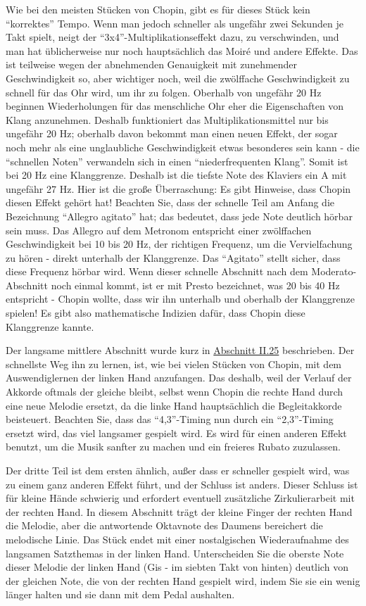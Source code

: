 Wie bei den meisten Stücken von Chopin, gibt es für dieses Stück kein \enquote{korrektes} Tempo.
Wenn man jedoch schneller als ungefähr zwei Sekunden je Takt spielt, neigt der \enquote{3x4}-Multiplikationseffekt dazu, zu verschwinden, und man hat üblicherweise nur noch hauptsächlich das Moiré und andere Effekte.
Das ist teilweise wegen der abnehmenden Genauigkeit mit zunehmender Geschwindigkeit so, aber wichtiger noch, weil die zwölffache Geschwindigkeit zu schnell für das Ohr wird, um ihr zu folgen.
Oberhalb von ungefähr 20 Hz beginnen Wiederholungen für das menschliche Ohr eher die Eigenschaften von Klang anzunehmen.
Deshalb funktioniert das Multiplikationsmittel nur bis ungefähr 20 Hz; oberhalb davon bekommt man einen neuen Effekt, der sogar noch mehr als eine unglaubliche Geschwindigkeit etwas besonderes sein kann - die \enquote{schnellen Noten} verwandeln sich in einen \enquote{niederfrequenten Klang}.
Somit ist bei 20 Hz eine Klanggrenze.
Deshalb ist die tiefste Note des Klaviers ein A mit ungefähr 27 Hz.
Hier ist die große Überraschung: Es gibt Hinweise, dass Chopin diesen Effekt gehört hat!
Beachten Sie, dass der schnelle Teil am Anfang die Bezeichnung \enquote{Allegro agitato} hat; das bedeutet, dass jede Note deutlich hörbar sein muss.
Das Allegro auf dem Metronom entspricht einer zwölffachen Geschwindigkeit bei 10 bis 20 Hz, der richtigen Frequenz, um die Vervielfachung zu hören - direkt unterhalb der Klanggrenze.
Das \enquote{Agitato} stellt sicher, dass diese Frequenz hörbar wird.
Wenn dieser schnelle Abschnitt nach dem Moderato-Abschnitt noch einmal kommt, ist er mit Presto bezeichnet, was 20 bis 40 Hz entspricht - Chopin wollte, dass wir ihn unterhalb und oberhalb der Klanggrenze spielen!
Es gibt also mathematische Indizien dafür, dass Chopin diese Klanggrenze kannte.

Der langsame mittlere Abschnitt wurde kurz in \hyperlink{c1ii25}{Abschnitt II.25} beschrieben.
Der schnellste Weg ihn zu lernen, ist, wie bei vielen Stücken von Chopin, mit dem Auswendiglernen der linken Hand anzufangen.
Das deshalb, weil der Verlauf der Akkorde oftmals der gleiche bleibt, selbst wenn Chopin die rechte Hand durch eine neue Melodie ersetzt, da die linke Hand hauptsächlich die Begleitakkorde beisteuert.
Beachten Sie, dass das \enquote{4,3}-Timing nun durch ein \enquote{2,3}-Timing ersetzt wird, das viel langsamer gespielt wird.
Es wird für einen anderen Effekt benutzt, um die Musik sanfter zu machen und ein freieres Rubato zuzulassen.

Der dritte Teil ist dem ersten ähnlich, außer dass er schneller gespielt wird, was zu einem ganz anderen Effekt führt, und der Schluss ist anders.
Dieser Schluss ist für kleine Hände schwierig und erfordert eventuell zusätzliche Zirkulierarbeit mit der rechten Hand.
In diesem Abschnitt trägt der kleine Finger der rechten Hand die Melodie, aber die antwortende Oktavnote des Daumens bereichert die melodische Linie.
Das Stück endet mit einer nostalgischen Wiederaufnahme des langsamen Satzthemas in der linken Hand.
Unterscheiden Sie die oberste Note dieser Melodie der linken Hand (Gis - im siebten Takt von hinten) deutlich von der gleichen Note, die von der rechten Hand gespielt wird, indem Sie sie ein wenig länger halten und sie dann mit dem Pedal aushalten.

